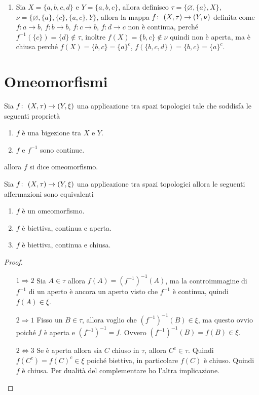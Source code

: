\begin{enumerate}
	\item Sia $X = \{a,b,c,d\}$  e $Y = \{a,b,c\}$, allora definisco $\tau = \{\varnothing, \{a\}, X\}$, $\nu = \{\varnothing, \{a\}, \{c\}, \{a,c\}, Y\}$, allora la mappa $f \colon\ (X,\tau) \rightarrow (Y,\nu)$ definita come $f \colon a \rightarrow b$,  $f \colon b \rightarrow b$, $f \colon c \rightarrow b$, $f \colon d \rightarrow c$ non è continua, perché $f^{-1}(\{c\}) = \{d\} \notin \tau$, inoltre $f(X) = \{b,c\} \notin \nu$ quindi non è aperta, ma è chiusa perché $f(X) = \{b,c\} = \{a\}^c$, $f(\{b,c,d\}) = \{b,c\} = \{a\}^c$.   
\end{enumerate}

\section{Omeomorfismi}

\begin{definition}
	Sia $f \colon\ (X,\tau) \rightarrow (Y,\xi)$ una applicazione tra spazi topologici tale che soddisfa le seguenti proprietà
	\begin{enumerate}
		\item $f$ è una bigezione tra $X$ e $Y$.
		\item $f$ e $f^{-1}$ sono continue.
	\end{enumerate} 
	allora $f$ si dice omeomorfismo. 
\end{definition}

\begin{theorem}
	Sia $f \colon\ (X,\tau) \rightarrow (Y,\xi)$ una applicazione tra spazi topologici allora le seguenti affermazioni sono equivalenti
	\begin{enumerate}
		\item $f$ è un omeomorfismo.
		\item $f$ è biettiva, continua e aperta.
		\item $f$ è biettiva, continua e chiusa.
	\end{enumerate}
\end{theorem}
\begin{proof}
	\begin{enumerate}
		\item[$1 \Rightarrow 2$] Sia $A \in \tau$ allora $f(A) = (f^{-1})^{-1}(A)$, ma la controimmagine di $f^{-1}$ di un aperto è ancora un aperto visto che $f^{-1}$ è continua, quindi $f(A) \in \xi$.
		\item[$2 \Rightarrow 1$] Fisso un $B \in \tau$, allora voglio che $(f^{-1})^{-1}(B) \in \xi$, ma questo ovvio poiché $f$ è aperta e $(f^{-1})^{-1} = f$. Ovvero $(f^{-1})^{-1}(B) = f(B) \in \xi$.
		\item[$2\Leftrightarrow 3$] Se è aperta allora sia $C$ chiuso in $\tau$, allora $C^{c} \in \tau$. Quindi $f(C^c) = f(C)^c \in \xi$ poiché biettiva, in particolare $f(C)$ è chiuso. Quindi $f$ è chiusa. Per dualità del complementare ho l'altra implicazione.
	\end{enumerate}
\end{proof}

